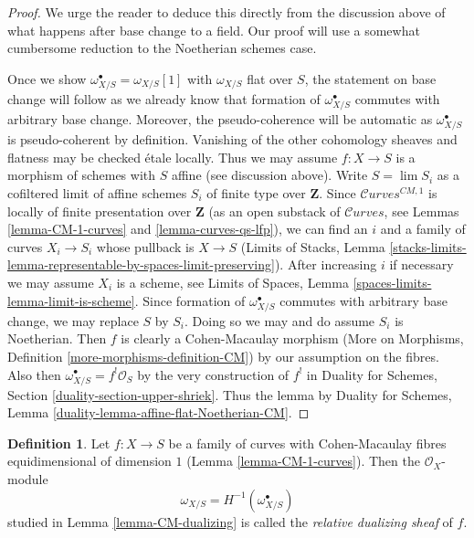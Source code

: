 \documentclass{stacks-project}
\theoremstyle{plain}
\theoremstyle{definition}
\newtheorem{definition}[subsection]{Definition}
\theoremstyle{remark}
\numberwithin{equation}{subsection}
\def\lim{\mathop{\mathrm{lim}}\nolimits}
\def\Curvesstack{\mathcal{C}\!\mathit{urves}}
\begin{document}
\begin{proof}
We urge the reader to deduce this directly from the discussion above
of what happens after base change to a field. Our proof will
use a somewhat cumbersome reduction to the Noetherian schemes case.

\medskip\noindent
Once we show $\omega_{X/S}^\bullet = \omega_{X/S}[1]$ with
$\omega_{X/S}$ flat over $S$, the statement on base change
will follow as we already know that formation of $\omega_{X/S}^\bullet$
commutes with arbitrary base change. Moreover, the pseudo-coherence
will be automatic as $\omega_{X/S}^\bullet$ is pseudo-coherent
by definition. Vanishing of the other cohomology sheaves and flatness 
may be checked \'etale locally. Thus we may assume $f : X \to S$
is a morphism of schemes with $S$ affine (see discussion above).
Write $S = \lim S_i$ as a cofiltered limit of affine schemes $S_i$
of finite type over $\mathbf{Z}$.
Since $\Curvesstack^{CM, 1}$ is locally of finite presentation over
$\mathbf{Z}$ (as an open substack of $\Curvesstack$, see
Lemmas \ref{lemma-CM-1-curves} and \ref{lemma-curves-qs-lfp}),
we can find an $i$ and a family
of curves $X_i \to S_i$ whose pullback is $X \to S$
(Limits of Stacks, Lemma
\ref{stacks-limits-lemma-representable-by-spaces-limit-preserving}).
After increasing $i$ if necessary we may assume $X_i$ is a scheme,
see Limits of Spaces, Lemma \ref{spaces-limits-lemma-limit-is-scheme}.
Since formation of $\omega_{X/S}^\bullet$ commutes with
arbitrary base change, we may replace $S$ by $S_i$.
Doing so we may and do assume $S_i$ is Noetherian.
Then $f$ is clearly a Cohen-Macaulay morphism
(More on Morphisms, Definition \ref{more-morphisms-definition-CM})
by our assumption on the fibres.
Also then $\omega_{X/S}^\bullet = f^!\mathcal{O}_S$
by the very construction of $f^!$ in
Duality for Schemes, Section \ref{duality-section-upper-shriek}.
Thus the lemma by Duality for Schemes, Lemma
\ref{duality-lemma-affine-flat-Noetherian-CM}.
\end{proof}

\begin{definition}
\label{definition-relative-dualizing-sheaf}
Let $f : X \to S$ be a family of curves with Cohen-Macaulay fibres
equidimensional of dimension $1$ (Lemma \ref{lemma-CM-1-curves}).
Then the $\mathcal{O}_X$-module
$$
\omega_{X/S} = H^{-1}(\omega_{X/S}^\bullet)
$$
studied in Lemma \ref{lemma-CM-dualizing}
is called the {\it relative dualizing sheaf} of $f$.
\end{definition}
\end{document}
